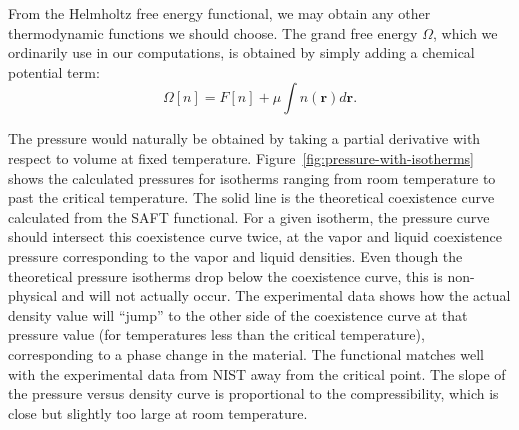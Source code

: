 \documentclass[letterpaper,twocolumn,amsmath,amssymb,prb]{revtex4-1}
\newcommand{\xx}{\textbf{r}}
\begin{document}
From the Helmholtz free energy functional, we may obtain any other
thermodynamic functions we should choose.  The grand free energy
$\Omega$, which we ordinarily use in our computations, is obtained by
simply adding a chemical potential term:
\begin{equation}
  \Omega[n] = F[n] + \mu \int n(\xx) d\xx.
\end{equation}

The pressure would naturally be obtained by taking a partial
derivative with respect to volume at fixed temperature. 
Figure~\ref{fig:pressure-with-isotherms} shows the calculated pressures for
isotherms ranging from room temperature to past the critical temperature. The
solid line is the theoretical coexistence curve calculated from the SAFT
functional. For a given isotherm, the pressure curve should intersect this
coexistence curve twice, at the vapor and liquid coexistence 
pressure corresponding to the vapor and liquid densities. Even
though the theoretical pressure isotherms drop below the coexistence curve,
this is non-physical and will not actually occur. The experimental data shows
how the actual density value will ``jump'' to the other side of 
the coexistence curve at that pressure value (for
temperatures less than the critical temperature), corresponding to a phase 
change in the material. The
functional matches well with the experimental data from NIST away from the
critical point. The slope of the pressure versus density curve is proportional
to the compressibility, which is close but slightly too large at room
temperature. 


\end{document}

